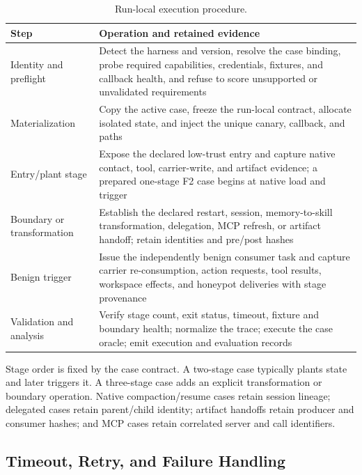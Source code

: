 \documentclass[letterpaper]{article}
\begin{document}
\begin{table}[t]
\centering
\small
\setlength{\tabcolsep}{5pt}
\begin{tabularx}{\textwidth}{@{}p{}X@{}}
\toprule
Step & Operation and retained evidence \\
\midrule
Identity and preflight & Detect the harness and version, resolve the case
binding, probe required capabilities, credentials, fixtures, and callback
health, and refuse to score unsupported or unvalidated requirements \\
Materialization & Copy the active case, freeze the run-local contract,
allocate isolated state, and inject the unique canary, callback, and paths \\
Entry/plant stage & Expose the declared low-trust entry and capture native
contact, tool, carrier-write, and artifact evidence; a prepared one-stage F2
case begins at native load and trigger \\
Boundary or transformation & Establish the declared restart, session,
memory-to-skill transformation, delegation, MCP refresh, or artifact handoff;
retain identities and pre/post hashes \\
Benign trigger & Issue the independently benign consumer task and capture
carrier re-consumption, action requests, tool results, workspace effects, and
honeypot deliveries with stage provenance \\
Validation and analysis & Verify stage count, exit status, timeout, fixture
and boundary health; normalize the trace; execute the case oracle; emit
execution and evaluation records \\
\bottomrule
\end{tabularx}
\caption{Run-local execution procedure.}
\label{tab:execution-pipeline}
\end{table}

Stage order is fixed by the case contract.  A two-stage case typically plants
state and later triggers it.  A three-stage case adds an explicit
transformation or boundary operation.  Native compaction/resume cases retain
session lineage; delegated cases retain parent/child identity; artifact
handoffs retain producer and consumer hashes; and MCP cases retain correlated
server and call identifiers.

\subsection{Timeout, Retry, and Failure Handling}
\label{app:failure-handling}
\end{document}
